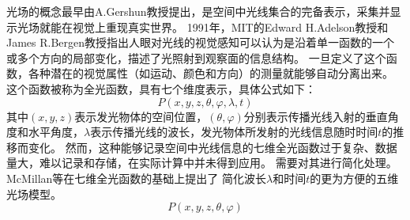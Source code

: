 %
%


%
%
%
%
%
%




\label{chap:part2}






光场的概念最早由A.Gershun教授提出，是空间中光线集合的完备表示，采集并显示光场就能在视觉上重现真实世界。
1991年，MIT的Edward H.Adelson教授和James R.Bergen教授指出人眼对光线的视觉感知可以认为是沿着单一函数的一个或多个方向的局部变化，描述了光照射到观察面的信息结构。
一旦定义了这个函数，各种潜在的视觉属性（如运动、颜色和方向）的测量就能够自动分离出来。
这个函数被称为全光函数，具有七个维度表示，具体公式如下：
\begin{equation}
	P(x,y,z,\theta,\varphi,\lambda,t)
\end{equation}
其中$(x,y,z)$表示发光物体的空间位置，$(\theta,\varphi)$分别表示传播光线入射的垂直角度和水平角度，$\lambda$表示传播光线的波长，发光物体所发射的光线信息随时时间$t$的推移而变化。
然而，这种能够记录空间中光线信息的七维全光函数过于复杂、数据量大，难以记录和存储，在实际计算中并未得到应用。
需要对其进行简化处理。
McMillan等在七维全光函数的基础上提出了
简化波长$\lambda$和时间$t$的更为方便的五维光场模型。
\begin{equation}
	P(x,y,z,\theta,\varphi)
\end{equation}


